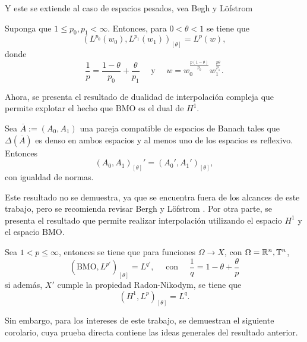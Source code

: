 Y este se extiende al caso de espacios pesados, vea Begh y Löfstrom \cite{bergh-lofstrom}
\begin{theorem}
	Suponga que $1\leq p_0,p_1<\infty$. Entonces, para $0<\theta<1$ se tiene que 
	\begin{equation*}
		(L^{p_0}(w_0), L^{p_1}(w_1))_{[\theta]} = L^p(w),
	\end{equation*}
	donde 
	\begin{equation*}
		\frac{1}{p} = \frac{1-\theta}{p_0} + \frac{\theta}{p_1} \quad \text{ y } \quad w = w_0^{\frac{p(1-\theta)}{p_0}} w_1^{\frac{p\theta}{p_1}}.
	\end{equation*}
	\label{theo:interpolation-Lpw}
\end{theorem}
Ahora, se presenta el resultado de dualidad de interpolación compleja que permite explotar el hecho que $\mathrm{BMO}$ es el dual de $H^1$.
\begin{theorem}
	Sea $\overline{A}:=(A_0, A_1)$ una pareja compatible de espacios de Banach tales que $\Delta(\overline{A})$ es denso en ambos espacios y al menos uno de los espacios es reflexivo. Entonces
	\begin{equation*}
		(A_0, A_1)_{[\theta]}' = (A_0', A_1')_{[\theta]},
	\end{equation*}
	con igualdad de normas.
\end{theorem}
Este resultado no se demuestra, ya que se encuentra fuera de los alcances de este trabajo, pero se recomienda revisar Bergh y Löfstrom \cite{bergh-lofstrom}. Por otra parte, se presenta el resultado que permite realizar interpolación utilizando el espacio $H^1$ y el espacio $\mathrm{BMO}$.
\begin{theorem}
	Sea $1<p\leq\infty$, entonces se tiene que para funciones $\Omega\to X$, con $\Omega=\mathbb{R}^n,\mathbb{T}^n$, 
	\begin{equation*}
		(\mathrm{BMO}, L^{p'})_{[\theta]} =L^{q'}, \quad \text{ con } \quad \frac{1}{q} = 1-\theta + \frac{\theta}{p}
	\end{equation*}
	si además, $X'$ cumple la propiedad Radon-Nikodym, se tiene que
	\begin{equation*}
		(H^1,L^p)_{[\theta]} = L^q.
	\end{equation*}
\end{theorem}
Sin embargo, para los intereses de este trabajo, se demuestran el siguiente corolario, cuya prueba directa contiene las ideas generales del resultado anterior.
